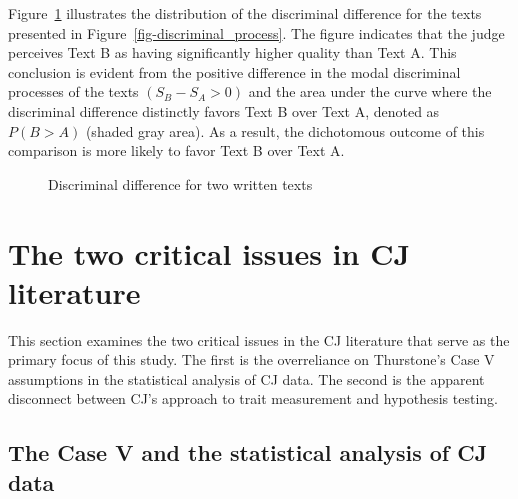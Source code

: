 \documentclass[
  authoryear,
  preprint,
  1p]{elsarticle}
\begin{document}
Figure~\ref{fig-discriminal_difference} illustrates the distribution of
the discriminal difference for the texts presented in
Figure~\ref{fig-discriminal_process}. The figure indicates that the
judge perceives Text B as having significantly higher quality than Text
A. This conclusion is evident from the positive difference in the modal
discriminal processes of the texts \((S_{B} - S_{A} > 0)\) and the area
under the curve where the discriminal difference distinctly favors Text
B over Text A, denoted as \(P(B > A)\) (shaded gray area). As a result,
the dichotomous outcome of this comparison is more likely to favor Text
B over Text A.

\begin{figure}


\caption{\label{fig-discriminal_difference}Discriminal difference for
two written texts}

\end{figure}%

\section{The two critical issues in CJ
literature}\label{sec-theory-issues}

This section examines the two critical issues in the CJ literature that
serve as the primary focus of this study. The first is the overreliance
on Thurstone's Case V assumptions in the statistical analysis of CJ
data. The second is the apparent disconnect between CJ's approach to
trait measurement and hypothesis testing.

\subsection{The Case V and the statistical analysis of CJ
data}\label{sec-theory-issue1}
\end{document}
